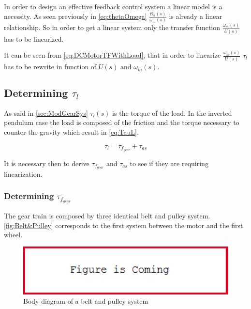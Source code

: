 In order to design an effective feedback control system a linear model is a necessity. As seen previously in \autoref{eq:thetaOmega} $\frac{\Theta_a(s)}{\omega_m(s)}$ is already a linear relationship. So in order to get a linear system only the transfer function $\frac{\omega_m(s)}{U(s)}$ has to be linearized.

It can be seen from \autoref{eq:DCMotorTFWithLoad}, that in order to linearize $\frac{\omega_m(s)}{U(s)}$ $\tau_l$ has to be rewrite in function of $U(s)$ and $\omega_m(s)$.

\subsection{Determining $\tau_l$}
As said in \autoref{sec:ModGearSys} $\tau_l(s)$ is the torque of the load. In the inverted pendulum case the load is composed of the friction and the torque necessary to counter the gravity which result in \autoref{eq:TauL}.

\begin{equation}\label{eq:TauL}
	\tau_l = \tau_{f_{gear}} + \tau_{as}
\end{equation}

It is necessary then to derive $\tau_{f_{gear}}$ and $\tau_{as}$ to see if they are requiring linearization.


\subsubsection*{Determining $\tau_{f_{gear}}$}
The gear train is composed by three identical belt and pulley system. \autoref{fig:Belt&Pulley} corresponds to the first system between the motor and the first wheel. 
\begin{figure}[htbp]
    \centering
    \includegraphics[width=1\textwidth]{figures/FigureIsComing.PNG}
    \caption{Body diagram of a belt and pulley system}
    \label{fig:Belt&Pulley}
\end{figure}

\startexplain
{}
\stopexplain



